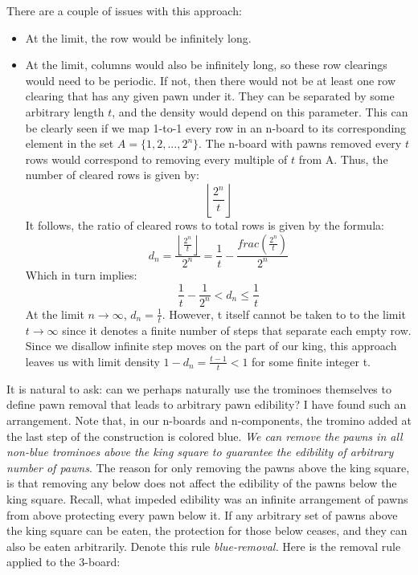 \documentclass{article}
\begin{document}
    There are a couple of issues with this approach:
    \begin{itemize}
    \item At the limit, the row would be infinitely long.
    \item At the limit, columns would also be infinitely long, so these row clearings would need to be periodic. If not, then there would not be at least one row clearing that has any given pawn under it. They can be separated by some arbitrary length $t$, and the density would depend on this parameter. This can be clearly seen if we map 1-to-1 every row in an n-board to its corresponding element in the set $A = \{1, 2, ..., 2^n \}$. The n-board with pawns removed every $t$ rows would correspond to removing every multiple of $t$ from A. Thus, the number of cleared rows is given by:
   $$\left\lfloor \frac{2^n}{t} \right\rfloor$$
     It follows, the ratio of cleared rows to total rows is given by the formula:
   $$d_n = \frac{\left\lfloor \frac{2^n}{t} \right\rfloor}{2^n} = \frac{1}{t} - \frac{frac(\frac{2^n}{t})}{2^n}$$
    Which in turn implies:
    $$\frac{1}{t} - \frac{1}{2^n}  < d_n \leq \frac{1}{t}$$
    At the limit $n \to \infty$, $d_n = \frac{1}{t}$. However, t itself cannot be taken to to the limit $t \to \infty$ since it denotes a finite number of steps that separate each empty row. Since we disallow infinite step moves on the part of our king, this approach leaves us with limit density $1 - d_n = \frac{t-1}{t} < 1$ for some finite integer t.
    \end{itemize}

   It is natural to ask: can we perhaps naturally use the trominoes themselves to define pawn removal that leads to arbitrary pawn edibility? I have found such an arrangement. Note that, in our n-boards and n-components, the tromino added at the last step of the construction is colored blue. \textit{We can remove the pawns in all non-blue trominoes above the king square to guarantee the edibility of arbitrary number of pawns}. The reason for only removing the pawns above the king square, is that removing any below does not affect the edibility of the pawns below the king square. Recall, what impeded edibility was an infinite arrangement of pawns from above protecting every pawn below it. If any arbitrary set of pawns above the king square can be eaten, the protection for those below ceases, and they can also be eaten arbitrarily. Denote this rule \textit{blue-removal.} Here is the removal rule applied to the 3-board: 

\end{document}
